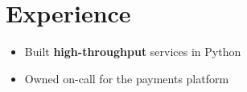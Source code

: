 \documentclass{article}
\newcommand{\resumeItem}[1]{\item #1}
\begin{document}
\section{Experience}
\begin{itemize}
\resumeItem{Built \textbf{high-throughput} services in Python}
\resumeItem{Owned on-call for the payments platform}
\end{itemize}
\end{document}
